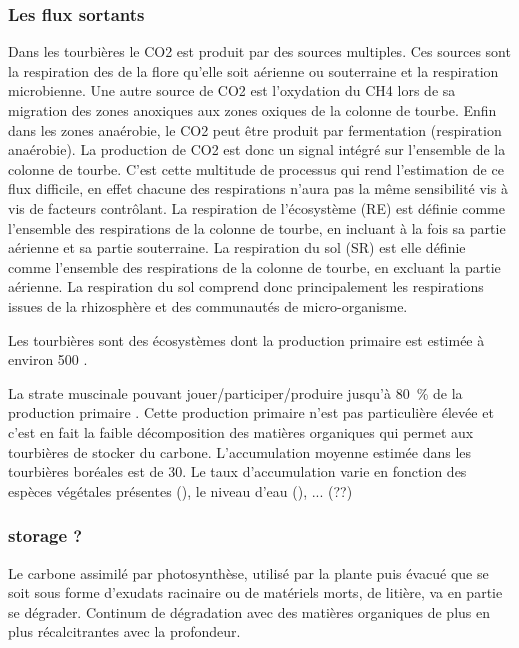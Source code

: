 \subsubsection{Les flux sortants}
Dans les tourbières le CO2 est produit par des sources multiples.
Ces sources sont la respiration des de la flore qu'elle soit aérienne ou souterraine et la respiration microbienne.
Une autre source de CO2 est l'oxydation du CH4 lors de sa migration des zones anoxiques aux zones oxiques de la colonne de tourbe.
Enfin dans les zones anaérobie, le CO2 peut être produit par fermentation (respiration anaérobie).
La production de CO2 est donc un signal intégré sur l'ensemble de la colonne de tourbe. 
C'est cette multitude de processus qui rend l'estimation de ce flux difficile, en effet chacune des respirations n'aura pas la même sensibilité vis à vis de facteurs contrôlant.
La respiration de l'écosystème (RE) est définie comme l'ensemble des respirations de la colonne de tourbe, en incluant à la fois sa partie aérienne et sa partie souterraine.
La respiration du sol (SR) est elle définie comme l'ensemble des respirations de la colonne de tourbe, en excluant la partie aérienne.
La respiration du sol comprend donc principalement les respirations issues de la rhizosphère et des communautés de micro-organisme.

Les tourbières sont des écosystèmes dont la production primaire est estimée à environ \SI{500}{\gcm} \cite{francez2000}. 


La strate muscinale pouvant jouer/participer/produire jusqu'à \SI{80}{\percent} de la production primaire \cite{francez2000}.
Cette production primaire n'est pas particulière élevée \plop et c'est en fait la faible décomposition des matières organiques qui permet aux tourbières de stocker du carbone.
L'accumulation moyenne estimée dans les tourbières boréales est de \SI{30}{\gcm}. Le taux d'accumulation varie en fonction des espèces végétales présentes (\plop), le niveau d'eau (\plop), ... (??)



\subsubsection{storage ?}

Le carbone assimilé par photosynthèse, utilisé par la plante puis évacué que se soit sous forme d'exudats racinaire ou de matériels morts, de litière, va en partie se dégrader.
Continum de dégradation avec des matières organiques de plus en plus récalcitrantes avec la profondeur.

